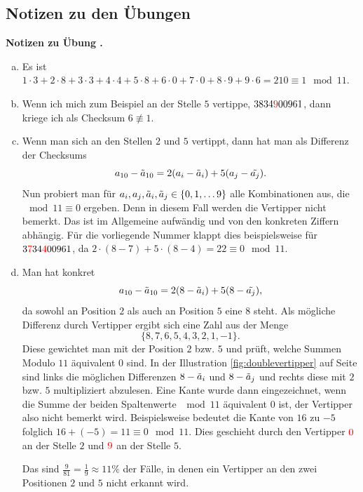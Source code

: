 \documentclass[%
11pt,%
twoside,%
titlepage,%
swissgerman,%
headsepline%
]{scrartcl}
\newcommand{\faReturnGray}{\textcolor{gray}{\faMailReply}} %
\theoremstyle{definition}
\theoremstyle{plain}
\newcommand{\concatueb}[1]{ueb:#1}%
\newcommand{\concatlsg}[1]{lsg:#1}%
\newcounter{uebcounter}[section]
\renewcommand{\theuebcounter}{\thesection.\arabic{uebcounter}}  %
\newenvironment{lsg}[1]{%
    \par\noindent\textbf{Notizen zu Übung \theuebcounter\label{\concatlsg{#1}}}
    \hfill\hyperref[\concatueb{#1}]{\faReturnGray}\par %
}{%
    \par%
}
\begin{document}
\clearpage

\subsection{Notizen zu den Übungen}

\begin{lsg}{isbn}
    \begin{enumerate}[a)]
        \item Es ist $1\cdot3+2\cdot8+3\cdot3+4\cdot4+5\cdot8+6\cdot0+7\cdot0+8\cdot9+9\cdot6=210\equiv1\mod11.$
        \item Wenn ich mich zum Beispiel an der Stelle $5$ vertippe, $3834\textcolor{red}{9}00961$, dann kriege ich als Checksum $6\not\equiv1$.
        \item Wenn man sich an den Stellen $2$ und $5$ vertippt, dann hat man als Differenz der Checksums
        $$a_{10}-\Tilde{a}_{10}=2(a_i-\Tilde{a}_i)+5(a_j-\Tilde{a_j}).$$
        Nun probiert man für $a_i,a_j,\Tilde{a}_i,\Tilde{a}_j\in\{0,1,\dots9\}$ alle Kombinationen aus, die $\mod11\equiv 0$ ergeben. Denn in diesem Fall werden die Vertipper nicht bemerkt. Das ist im Allgemeine aufwändig und von den konkreten Ziffern abhängig. Für die vorliegende Nummer klappt dies beispielsweise für $3\textcolor{red}{7}34\textcolor{red}{4}00961$, da $2\cdot(8-7)+5\cdot(8-4)=22\equiv0\mod11$.
        \item Man hat konkret
        $$a_{10}-\Tilde{a}_{10}=2(8-\Tilde{a}_i)+5(8-\Tilde{a_j}),$$
        da sowohl an Position $2$ als auch an Position $5$ eine $8$ steht. Als mögliche Differenz durch Vertipper ergibt sich eine Zahl aus der Menge
        $$\{8,7,6,5,4,3,2,1,-1\}.$$
        Diese gewichtet man mit der Position $2$ bzw. $5$ und prüft, welche Summen Modulo $11$ äquivalent $0$ sind.
        In der Illustration \ref{fig:doublevertipper} auf Seite \pageref{fig:doublevertipper} sind links die möglichen Differenzen $8-\Tilde{a}_i$ und $8-\Tilde{a}_j$ und rechts diese mit $2$ bzw. $5$ multipliziert abzulesen. Eine Kante wurde dann eingezeichnet, wenn die Summe der beiden Spaltenwerte $\mod11$ äquivalent $0$ ist, der Vertipper also nicht bemerkt wird. Beispielsweise bedeutet die Kante von $16$ zu $-5$ folglich $16+(-5)=11\equiv0\mod11$. Dies geschieht durch den Vertipper $\textcolor{red}{0}$ an der Stelle $2$ und $\textcolor{red}{9}$ an der Stelle $5$.
        
        Das sind $\frac{9}{81}=\frac{1}{9}\approx11\%$ der Fälle, in denen ein Vertipper an den zwei Positionen $2$ und $5$ nicht erkannt wird.


\end{enumerate}
\end{lsg}
\end{document}
